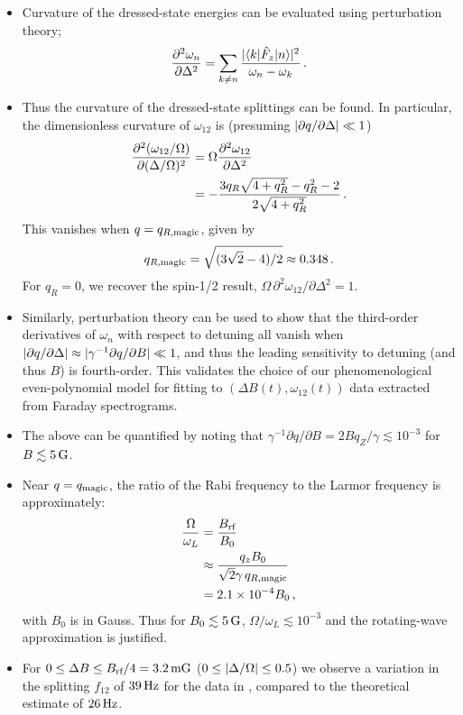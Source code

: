 \documentclass[aps,prl,reprint,superscriptaddress,floatfix]{revtex4-1}
\begin{document}
\begin{itemize}
    \item Curvature of the dressed-state energies can be evaluated using perturbation theory;
    \[
    \frac{\partial ^2\omega_n}{\partial \Delta^2} = \sum_{k \neq n} \frac{\vert \langle k \vert  \hat{F}_z \vert n \rangle  \vert ^2}{\omega_n - \omega_k} \, .
    \]
    \item Thus the curvature of the dressed-state splittings can be found. In particular, the dimensionless curvature of $\omega_{12}$ is (presuming $\vert \partial q / \partial \Delta \vert  \ll 1$) 
    \begin{align*}
    \frac{\partial ^2(\omega_{12}/\Omega)}{\partial (\Delta/\Omega)^2} &= \Omega \frac{\partial ^2\omega_{12}}{\partial \Delta^2} \\ &= -\frac{3 q_R \sqrt{4 + q_R^2} - q_R^2 - 2}{2 \sqrt{4 + q_R^2}} \, .
    \end{align*}
    This vanishes when $q = q_{R,\text{magic}}$, given by
    \[
    q_{R,\text{magic}} = \sqrt{(3\sqrt{2} - 4)/2} \approx 0.348 \, .
    \]
    For $q_R = 0$, we recover the spin-1/2 result, $\Omega\, \partial^2\omega_{12}/\partial \Delta^2 = 1$.
    \item Similarly, perturbation theory can be used to show that the third-order derivatives of $\omega_n$ with respect to detuning all vanish when $\vert \partial q / \partial \Delta \vert  \approx \vert \gamma^{-1} \partial q / \partial B \vert  \ll 1$, and thus the leading sensitivity to detuning (and thus $B$) is fourth-order. This validates the choice of our phenomenological even-polynomial model for fitting to $(\Delta B(t), \omega_{12}(t))$ data extracted from Faraday spectrograms.
    \item The above can be quantified by noting that $\gamma^{-1} \partial q / \partial B = 2 B q_Z / \gamma \lesssim 10^{-3}$ for $B \lesssim \unit[5]{G}$.
    \item Near $q = q_{\text{magic}}$, the ratio of the Rabi frequency to the Larmor frequency is approximately:
    \begin{align*}
        \frac{\Omega}{\omega_L} &= \frac{B_\text{rf}}{B_0} \\
                                &\approx \frac{q_z B_0}{\sqrt{2} \gamma \, q_{R,\text{magic}}} \\
                                &= 2.1\times10^{-4} B_0 \, ,
    \end{align*}
    with $B_0$ is in Gauss.
    Thus for $B_0 \lesssim \unit[5]{G}$, $\Omega/\omega_L \lesssim 10^{-3}$ and the rotating-wave approximation is justified.
    \item For $0 \leq \Delta B \leq B_{\text{rf}}/4 = \unit[3.2]{mG}$ ($0 \leq \vert \Delta/\Omega \vert  \leq 0.5$) we observe a variation in the splitting $f_{12}$ of $\unit[39]{Hz}$ for the data in , compared to the theoretical estimate of $\unit[26]{Hz}$.

\end{itemize}
\end{document}
